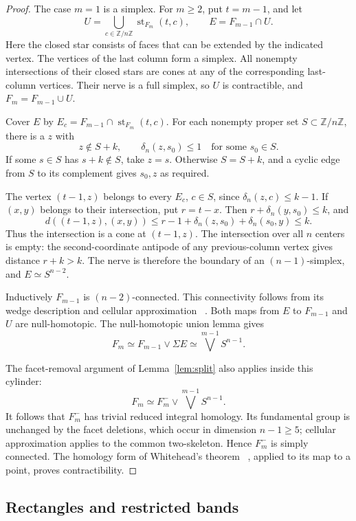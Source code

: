 \documentclass[11pt]{amsart}
\newcommand{\ZZ}{\mathbb Z}
\newcommand{\st}{\operatorname{st}}
\begin{document}
\begin{proof}
The case \(m=1\) is a simplex. For \(m\geq2\), put \(t=m-1\), and let
\[
U=\bigcup_{c\in\ZZ/n\ZZ}\st_{F_m}(t,c),
\qquad E=F_{m-1}\cap U.
\]
Here the closed star consists of faces that can be extended by the indicated
vertex. The vertices of the last column form a simplex. All nonempty
intersections of their closed stars are cones at any of the corresponding
last-column vertices. Their nerve is a full simplex, so \(U\) is
contractible, and \(F_m=F_{m-1}\cup U\).

Cover \(E\) by \(E_c=F_{m-1}\cap\st_{F_m}(t,c)\).
For each nonempty proper set \(S\subset\ZZ/n\ZZ\), there is a \(z\) with
\[
z\notin S+k,\qquad \delta_n(z,s_0)\leq1
\quad\text{for some }s_0\in S.                 \tag{*}
\]
If some \(s\in S\) has \(s+k\notin S\), take \(z=s\).
Otherwise \(S=S+k\), and a cyclic edge from \(S\) to its complement
gives \(s_0,z\) as required.

The vertex \((t-1,z)\) belongs to every \(E_c\), \(c\in S\), since
\(\delta_n(z,c)\leq k-1\). If \((x,y)\) belongs to their intersection,
put \(r=t-x\). Then \(r+\delta_n(y,s_0)\leq k\), and
\[
d((t-1,z),(x,y))
\leq r-1+\delta_n(z,s_0)+\delta_n(s_0,y)\leq k.
\]
Thus the intersection is a cone at \((t-1,z)\).
The intersection over all \(n\) centers is empty: the second-coordinate
antipode of any previous-column vertex gives distance \(r+k>k\).
The nerve is therefore the boundary of an \((n-1)\)-simplex, and
\(E\simeq S^{n-2}\).

Inductively \(F_{m-1}\) is \((n-2)\)-connected. This connectivity follows
from its wedge description and cellular approximation
~\cite[Theorem~4.8]{hatcher}. Both maps from \(E\) to \(F_{m-1}\) and
\(U\) are null-homotopic. The null-homotopic union lemma gives
\[
F_m\simeq F_{m-1}\vee\Sigma E
\simeq\bigvee^{m-1}S^{n-1}.
\]

The facet-removal argument of Lemma~\ref{lem:split} also applies inside
this cylinder:
\[
F_m\simeq F_m^-\vee\bigvee^{m-1}S^{n-1}.
\]
It follows that \(F_m^-\) has trivial reduced integral homology.
Its fundamental group is unchanged by the facet deletions, which occur
in dimension \(n-1\geq5\); cellular approximation applies to the common
two-skeleton. Hence \(F_m^-\) is simply connected.
The homology form of Whitehead's theorem
~\cite[Corollary~4.33]{hatcher}, applied to its map to a point, proves
contractibility.
\end{proof}

\subsection*{Rectangles and restricted bands}
\end{document}

